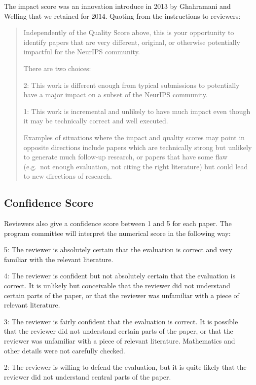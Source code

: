 The impact score was an innovation introduce in 2013 by Ghahramani and
Welling that we retained for 2014. Quoting from the instructions to
reviewers:

\begin{quote}
Independently of the Quality Score above, this is your opportunity to
identify papers that are very different, original, or otherwise
potentially impactful for the NeurIPS community.

There are two choices:

2: This work is different enough from typical submissions to potentially
have a major impact on a subset of the NeurIPS community.

1: This work is incremental and unlikely to have much impact even though
it may be technically correct and well executed.

Examples of situations where the impact and quality scores may point in
opposite directions include papers which are technically strong but
unlikely to generate much follow-up research, or papers that have some
flaw (e.g.~not enough evaluation, not citing the right literature) but
could lead to new directions of research.
\end{quote}

\hypertarget{confidence-score}{%
\subsection{Confidence Score}\label{confidence-score}}

Reviewers also give a confidence score between 1 and 5 for each paper.
The program committee will interpret the numerical score in the
following way:

5: The reviewer is absolutely certain that the evaluation is correct and
very familiar with the relevant literature.

4: The reviewer is confident but not absolutely certain that the
evaluation is correct. It is unlikely but conceivable that the reviewer
did not understand certain parts of the paper, or that the reviewer was
unfamiliar with a piece of relevant literature.

3: The reviewer is fairly confident that the evaluation is correct. It
is possible that the reviewer did not understand certain parts of the
paper, or that the reviewer was unfamiliar with a piece of relevant
literature. Mathematics and other details were not carefully checked.

2: The reviewer is willing to defend the evaluation, but it is quite
likely that the reviewer did not understand central parts of the paper.

